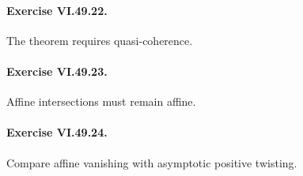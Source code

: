 \paragraph{Exercise VI.49.22.}
\begin{hint}
The theorem requires quasi-coherence.
\end{hint}

\paragraph{Exercise VI.49.23.}
\begin{hint}
Affine intersections must remain affine.
\end{hint}

\paragraph{Exercise VI.49.24.}
\begin{hint}
Compare affine vanishing with asymptotic positive twisting.
\end{hint}
